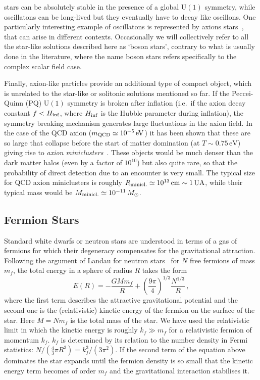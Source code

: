 \documentclass[11pt,a4paper]{article}
\newcommand{\be}{\begin{equation}}
\newcommand{\ee}{\end{equation}}
\begin{document}
stars can be absolutely stable in the presence of a global U$(1)$ symmetry, while oscillatons can be long-lived but they eventually have to decay like oscillons. One particularly interesting example of oscillatons is represented by axions stars~\cite{Kolb:1993zz, Kolb:1993hw}, that can arise in different contexts. Occasionally we will collectively refer to all the star-like solutions described here as ‘boson stars’, contrary to what is usually done in the literature, where the name boson stars refers specifically to the complex scalar field case.

Finally, axion-like particles provide an additional type of compact object, which is unrelated to the star-like or solitonic solutions mentioned so far. If the Peccei-Quinn (PQ) U$(1)$ symmetry is broken after inflation (i.e.~if the axion decay constant $f < H_{\rm inf}$, where $H_{\rm inf}$ is the Hubble parameter during inflation), the symmetry breaking mechanism generates large fluctuations in the axion field. In the case of the QCD axion ($m_{\rm QCD} \simeq 10^{-5} \, \rm eV$) it has been shown that these are so large that collapse before the start of matter domination (at $T \sim 0.75 \, \text{eV}$) giving rise to \textit{axion miniclusters}~\cite{Hogan:1988mp, Kolb:1993zz, Kolb:1993hw, Enander:2017ogx}. These objects would be much denser than the dark matter halos (even by a factor of $10^{10}$) but also quite rare, so that the probability of direct detection due to an encounter is very small. The typical size for QCD axion miniclusters is roughly $R_{\rm minicl.} \simeq 10^{13} \, \rm cm \sim 1 \, \rm UA$, while their typical mass would be $M_{\rm minicl.} \simeq 10^{-11} \, M_{\odot}$.

\subsection{Fermion Stars}
\label{sec:FermionStars}

Standard white dwarfs or neutron stars are understood in terms of a gas of fermions for which their degeneracy compensates for the gravitational attraction.
Following the argument of Landau for neutron stars~\cite{Narain:2006kx} for $N$ free fermions of mass $m_f$,  the total energy in a sphere of radius $R$ takes the form
\be
E(R)=-\frac{GMm_f}{R} + \left(\frac{9\pi}{4}\right)^{1/3} \frac{N^{1/3}}{R}\,,
\ee
where the first term describes the attractive gravitational potential and the second one is the (relativistic) kinetic energy of the fermion on the surface of the star. Here $M=Nm_f$ is the total mass of the star. We have used the relativistic limit in which the kinetic energy is roughly $k_f\gg m_f$ for a relativistic fermion of momentum $k_f.$ $k_f$ is determined by its relation to the number density in Fermi statistics: $N/(\frac{4}{3}\pi R^3)=k_f^3/(3\pi^2)$. If the second term of the equation above dominates the star expands until the fermion density is so small that the kinetic energy term becomes of  order $m_f$ and the gravitational interaction stabilises it. 
\end{document}
